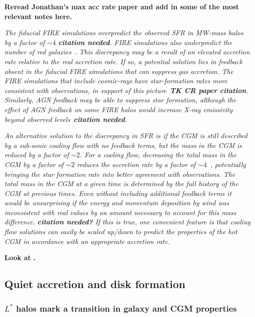 \documentclass[fleqn,usenatbib]{mnras}
\begin{document}
\textbf{Reread Jonathan's max acc rate paper and add in some of the most relevant notes here.}

\textit{
The fiducial FIRE simulations overpredict the observed SFR in MW-mass halos by a factor of $\sim 4$ \textbf{citation needed}.
FIRE simulations also underpredict the number of red galaxies~\citep{Garrison-Kimmel2017}.
This discrepancy may be a result of an elevated accretion rate relative to the real accretion rate.
If so, a potential solution lies in feedback absent in the fiducial FIRE simulations that can suppress gas accretion.
The FIRE simulations that include cosmic-rays have star-formation rates more consistent with observations, in support of this picture~\textbf{TK CR paper citation}.
Similarly, AGN feedback may be able to suppress star formation, although the effect of AGN feedback on some FIRE halos would increase X-ray emissivity beyond observed levels~\textbf{citation needed}. 
}

\textit{
An alternative solution to the discrepancy in SFR is if the CGM is still described by a sub-sonic cooling flow with no feedback terms, but the mass in the CGM is reduced by a factor of  $\sim2$.
For a cooling flow, decreasing the total mass in the CGM by a factor of $\sim 2$ reduces the accretion rate by a factor of $\sim4$~\cite{Stern2019}, potentially bringing the star formation rate into better agreement with observations.
The total mass in the CGM at a given time is determined by the full history of the CGM at previous times.
Even without including additional feedback terms it would be unsurprising if the energy and momentum deposition by wind was inconsistent with real values by an amount necessary to account for this mass difference. \textbf{citation needed?}
If this is true, one convenient feature is that cooling flow solutions can easily be scaled up/down to predict the properties of the hot CGM in accordance with an appropriate accretion rate.
}

\textbf{Look at \cite{Dekel2014}.}

\subsection{Quiet accretion and disk formation}
\label{s: disk formation}

\subsubsection{$L^*$ halos mark a transition in galaxy and CGM properties}
\end{document}

